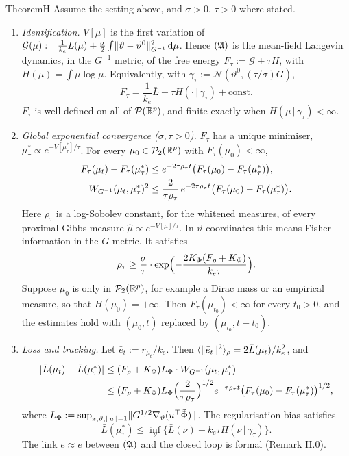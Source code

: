 \begin{thm}{Theorem}{H}
Assume the setting above, and $\sigma > 0$, $\tau > 0$ where stated.
\begin{enumerate}[label=\textup{(\roman*)}]
  \item \emph{Identification.} $V[\mu]$ is the first variation of
  $\mathcal{G}(\mu) := \frac{1}{k_e}\bar L(\mu) + \frac{\sigma}{2}\int\lVert \vartheta - \vartheta^0\rVert^2_{G^{-1}}\,\mathrm{d}\mu$.
  Hence $(\mathfrak{A})$ is the mean-field Langevin dynamics, in the $G^{-1}$ metric, of the free energy
  $F_\tau := \mathcal{G} + \tau H$, with $H(\mu) = \int\mu\log\mu$. Equivalently, with
  $\gamma_\tau := \mathcal{N}(\vartheta^0, (\tau/\sigma)G)$,
  \[
    F_\tau = \frac{1}{k_e}\bar L + \tau H(\cdot\,|\,\gamma_\tau) + \mathrm{const}.
  \]
  $F_\tau$ is well defined on all of $\mathcal{P}(\mathbb{R}^p)$, and finite exactly when $H(\mu\,|\,\gamma_\tau) < \infty$.

  \item \emph{Global exponential convergence \textup{(}$\sigma, \tau > 0$\textup{)}.} $F_\tau$ has a unique
  minimiser, $\mu^*_\tau \propto e^{-V[\mu^*_\tau]/\tau}$. For every $\mu_0 \in \mathcal{P}_2(\mathbb{R}^p)$ with
  $F_\tau(\mu_0) < \infty$,
  \begin{align*}
    F_\tau(\mu_t) - F_\tau(\mu^*_\tau) &\le e^{-2\tau\rho_\tau t}\bigl(F_\tau(\mu_0) - F_\tau(\mu^*_\tau)\bigr), \\
    W_{G^{-1}}(\mu_t, \mu^*_\tau)^2 &\le \frac{2}{\tau\rho_\tau}\,e^{-2\tau\rho_\tau t}\bigl(F_\tau(\mu_0)
    - F_\tau(\mu^*_\tau)\bigr).
  \end{align*}
  Here $\rho_\tau$ is a log-Sobolev constant, for the whitened measures, of every proximal Gibbs measure
  $\hat\mu \propto e^{-V[\mu]/\tau}$. In $\vartheta$-coordinates this means Fisher information in the $G$ metric. It
  satisfies
  \[
    \rho_\tau \ge \frac{\sigma}{\tau}\cdot\exp\Bigl(-\frac{2K_\Phi(F_\rho + K_\Phi)}{k_e\tau}\Bigr).
  \]
  Suppose $\mu_0$ is only in $\mathcal{P}_2(\mathbb{R}^p)$, for example a Dirac mass or an empirical measure, so that
  $H(\mu_0) = +\infty$. Then $F_\tau(\mu_{t_0}) < \infty$ for every $t_0 > 0$, and the estimates hold with $(\mu_0, t)$
  replaced by $(\mu_{t_0}, t - t_0)$.

  \item \emph{Loss and tracking.} Let $\bar e_t := r_{\mu_t}/k_e$. Then
  $\langle\lVert \bar e_t\rVert^2\rangle_\rho = 2\bar L(\mu_t)/k_e^2$, and
  \begin{align*}
    \lvert \bar L(\mu_t) - \bar L(\mu^*_\tau)\rvert
    &\le (F_\rho + K_\Phi)L_\Phi\cdot W_{G^{-1}}(\mu_t, \mu^*_\tau) \\
    &\le (F_\rho + K_\Phi)L_\Phi\Bigl(\frac{2}{\tau\rho_\tau}\Bigr)^{1/2}e^{-\tau\rho_\tau t}
    \bigl(F_\tau(\mu_0) - F_\tau(\mu^*_\tau)\bigr)^{1/2},
  \end{align*}
  where $L_\Phi := \sup_{x,\vartheta,\lVert u\rVert=1}\lVert G^{1/2}\nabla_\vartheta(u^\top\tilde\Phi)\rVert$. The regularisation
  bias satisfies
  \[
    \bar L(\mu^*_\tau) \le \inf_\nu\bigl\{\bar L(\nu) + k_e\tau H(\nu\,|\,\gamma_\tau)\bigr\}.
  \]
  The link $e \approx \bar e$ between $(\mathfrak{A})$ and the closed loop is formal (Remark H.0).


\end{enumerate}
\end{thm}
